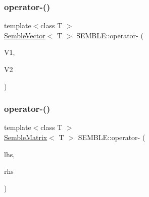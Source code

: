 \mbox{\label{namespaceSEMBLE_aa198a856a86831d5093cdcaff2fd6d4d}} 
\subsubsection{\texorpdfstring{operator-\/()}{operator-()}\hspace{0.1cm}{\footnotesize\ttfamily [5/8]}}
{\footnotesize\ttfamily template$<$class T $>$ \\
\mbox{\hyperlink{structSEMBLE_1_1SembleVector}{Semble\+Vector}}$<$ T $>$ S\+E\+M\+B\+L\+E\+::operator-\/ (\begin{DoxyParamCaption}\item[{const itpp\+::\+Vec$<$ T $>$ \&}]{V1,  }\item[{const \mbox{\hyperlink{structSEMBLE_1_1SembleVector}{Semble\+Vector}}$<$ T $>$ \&}]{V2 }\end{DoxyParamCaption})}

\mbox{\label{namespaceSEMBLE_a51078a127a232790773b793b2f6fb149}} 
\subsubsection{\texorpdfstring{operator-\/()}{operator-()}\hspace{0.1cm}{\footnotesize\ttfamily [6/8]}}
{\footnotesize\ttfamily template$<$class T $>$ \\
\mbox{\hyperlink{structSEMBLE_1_1SembleMatrix}{Semble\+Matrix}}$<$ T $>$ S\+E\+M\+B\+L\+E\+::operator-\/ (\begin{DoxyParamCaption}\item[{const \mbox{\hyperlink{structSEMBLE_1_1SembleMatrix}{Semble\+Matrix}}$<$ T $>$ \&}]{lhs,  }\item[{const \mbox{\hyperlink{structSEMBLE_1_1SembleMatrix}{Semble\+Matrix}}$<$ T $>$ \&}]{rhs }\end{DoxyParamCaption})}

\mbox{\label{namespaceSEMBLE_a15e5f0355da81ca6207bb74a62d0b669}} 
